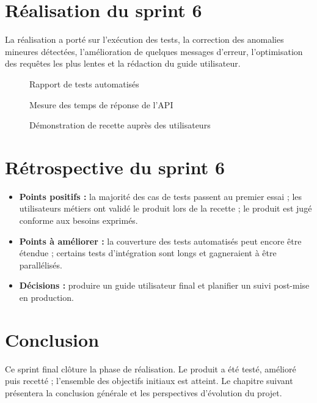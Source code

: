 \section{Réalisation du sprint 6}
La réalisation a porté sur l'exécution des tests, la correction des anomalies
mineures détectées, l'amélioration de quelques messages d'erreur, l'optimisation
des requêtes les plus lentes et la rédaction du guide utilisateur.

\begin{figure}[h!]
\centering
{}
\caption{Rapport de tests automatisés}
\end{figure}

\begin{figure}[h!]
\centering
{}
\caption{Mesure des temps de réponse de l'API}
\end{figure}

\begin{figure}[h!]
\centering
{}
\caption{Démonstration de recette auprès des utilisateurs}
\end{figure}

\section{Rétrospective du sprint 6}
\begin{itemize}
\item \textbf{Points positifs :} la majorité des cas de tests passent au premier
essai ; les utilisateurs métiers ont validé le produit lors de la recette ; le
produit est jugé conforme aux besoins exprimés.
\item \textbf{Points à améliorer :} la couverture des tests automatisés peut encore
être étendue ; certains tests d'intégration sont longs et gagneraient à être
parallélisés.
\item \textbf{Décisions :} produire un guide utilisateur final et planifier un suivi
post-mise en production.
\end{itemize}

\section*{Conclusion}
Ce sprint final clôture la phase de réalisation. Le produit a été testé,
amélioré puis recetté ; l'ensemble des objectifs initiaux est atteint. Le chapitre
suivant présentera la conclusion générale et les perspectives d'évolution du projet.

